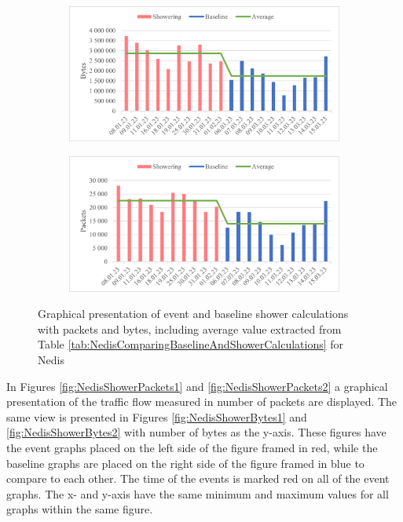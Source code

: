 \begin{figure}[H]
    \centering
    \begin{subfigure}{0.8\textwidth}
        \centering
        \includegraphics[width=1\hsize]{figures/Nedis_Shower_Calculations_Bytes.png} 
    \end{subfigure}
    \begin{subfigure}{0.8\textwidth}
        \centering
        \includegraphics[width=1\hsize]{figures/Nedis_Shower_Calculations_Packets.png} 
    \end{subfigure}
    \caption{Graphical presentation of event and baseline shower calculations with packets and bytes, including average value extracted from Table \ref{tab:NedisComparingBaselineAndShowerCalculations} for Nedis}
    \label{fig:NedisShowerCalculations}
\end{figure}

In Figures \ref{fig:NedisShowerPackets1} and \ref{fig:NedisShowerPackets2} a graphical presentation of the traffic flow measured in number of packets are displayed. The same view is presented in Figures \ref{fig:NedisShowerBytes1} and \ref{fig:NedisShowerBytes2} with number of bytes as the y-axis. These figures have the event graphs placed on the left side of the figure framed in red, while the baseline graphs are placed on the right side of the figure framed in blue to compare to each other. The time of the events is marked red on all of the event graphs. The x- and y-axis have the same minimum and maximum values for all graphs within the same figure. 

